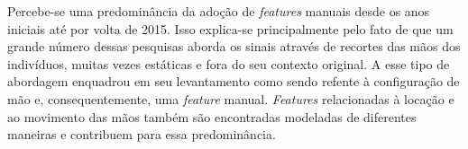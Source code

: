 

Percebe-se uma predominância da adoção de \textit{features} manuais desde os anos iniciais até por volta de 2015. Isso explica-se principalmente pelo fato de que um grande número dessas pesquisas aborda os sinais através de recortes das mãos dos indivíduos, muitas vezes estáticas e fora do seu contexto original. A esse tipo de abordagem  enquadrou em seu levantamento como sendo refente à configuração de mão e, consequentemente, uma \textit{feature} manual. \textit{Features} relacionadas à locação e ao movimento das mãos também são encontradas modeladas de diferentes maneiras e contribuem para essa predominância.





